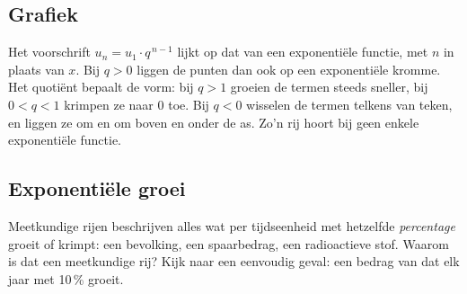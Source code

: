 
\begin{oefeningen}
\end{oefeningen}

\subsection{Grafiek}

Het voorschrift $u_n = u_1 \cdot q^{\,n-1}$ lijkt op dat van een exponentiële functie, met $n$ in plaats van $x$. Bij $q > 0$ liggen de punten dan ook op een exponentiële kromme. Het quotiënt bepaalt de vorm: bij $q > 1$ groeien de termen steeds sneller, bij $0 < q < 1$ krimpen ze naar 0 toe. Bij $q < 0$ wisselen de termen telkens van teken, en liggen ze om en om boven en onder de as. Zo'n rij hoort bij geen enkele exponentiële functie.


\subsection{Exponentiële groei}

Meetkundige rijen beschrijven alles wat per tijdseenheid met hetzelfde \textit{percentage} groeit of krimpt: een bevolking, een spaarbedrag, een radioactieve stof. Waarom is dat een meetkundige rij? Kijk naar een eenvoudig geval: een bedrag van  dat elk jaar met 10\,\% groeit.

